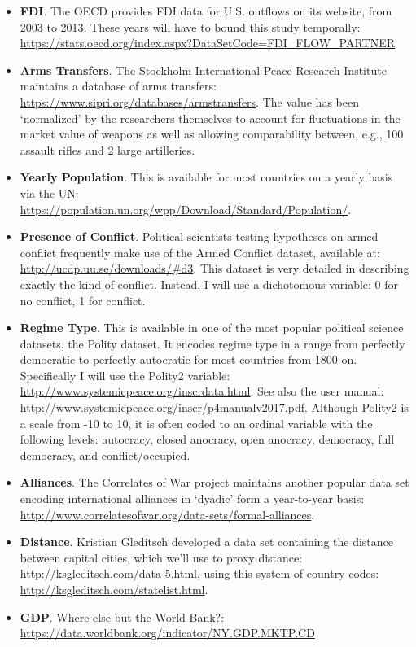 \documentclass[11pt,]{article}
\begin{document}
\begin{itemize}
\item
  \textbf{FDI}. The OECD provides FDI data for U.S. outflows on its
  website, from 2003 to 2013. These years will have to bound this study
  temporally:
  \url{https://stats.oecd.org/index.aspx?DataSetCode=FDI_FLOW_PARTNER}
\item
  \textbf{Arms Transfers}. The Stockholm International Peace Research
  Institute maintains a database of arms transfers:
  \url{https://www.sipri.org/databases/armstransfers}. The value has
  been `normalized' by the researchers themselves to account for
  fluctuations in the market value of weapons as well as allowing
  comparability between, e.g., 100 assault rifles and 2 large
  artilleries.
\item
  \textbf{Yearly Population}. This is available for most countries on a
  yearly basis via the UN:
  \url{https://population.un.org/wpp/Download/Standard/Population/}.
\item
  \textbf{Presence of Conflict}. Political scientists testing hypotheses
  on armed conflict frequently make use of the Armed Conflict dataset,
  available at: \url{http://ucdp.uu.se/downloads/\#d3}. This dataset is
  very detailed in describing exactly the kind of conflict. Instead, I
  will use a dichotomous variable: 0 for no conflict, 1 for conflict.
\item
  \textbf{Regime Type}. This is available in one of the most popular
  political science datasets, the Polity dataset. It encodes regime type
  in a range from perfectly democratic to perfectly autocratic for most
  countries from 1800 on. Specifically I will use the Polity2 variable:
  \url{http://www.systemicpeace.org/inscrdata.html}. See also the user
  manual: \url{http://www.systemicpeace.org/inscr/p4manualv2017.pdf}.
  Although Polity2 is a scale from -10 to 10, it is often coded to an
  ordinal variable with the following levels: autocracy, closed
  anocracy, open anocracy, democracy, full democracy, and
  conflict/occupied.
\item
  \textbf{Alliances}. The Correlates of War project maintains another
  popular data set encoding international alliances in `dyadic' form a
  year-to-year basis:
  \url{http://www.correlatesofwar.org/data-sets/formal-alliances}.
\item
  \textbf{Distance}. Kristian Gleditsch developed a data set containing
  the distance between capital cities, which we'll use to proxy
  distance: \url{http://ksgleditsch.com/data-5.html}, using this system
  of country codes: \url{http://ksgleditsch.com/statelist.html}.
\item
  \textbf{GDP}. Where else but the World Bank?:
  \url{https://data.worldbank.org/indicator/NY.GDP.MKTP.CD}
\end{itemize}
\end{document}
